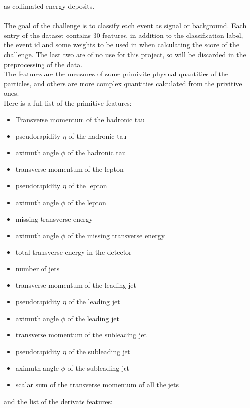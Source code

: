 \documentclass[12pt]{article}
\begin{document}
as collimated energy deposits. \\ \\
The goal of the challenge is to classify each event as signal or background. Each entry of the dataset
contains $30$ features, in addition to the classification label, the event id and some weights to be used
in when calculating the score of the challenge. The last two are of no use for this project, so will be 
discarded in the preprocessing of the data. \\
The features are the measures of some primivite physical quantities of the particles, and others are more
complex quantities calculated from the privitive ones. \\
Here is a full list of the primitive features:
\begin{itemize}
  \item Transverse momentum of the hadronic tau
  \item pseudorapidity $\eta$ of the hadronic tau
  \item aximuth angle $\phi$ of the hadronic tau
  \item transverse momentum of the lepton
  \item pseudorapidity $\eta$ of the lepton
  \item aximuth angle $\phi$ of the lepton
  \item missing transverse energy
  \item aximuth angle $\phi$ of the missing transverse energy
  \item total transverse energy in the detector
  \item number of jets
  \item transverse momentum of the leading jet
  \item pseudorapidity $\eta$ of the leading jet
  \item aximuth angle $\phi$ of the leading jet
  \item transverse momentum of the subleading jet
  \item pseudorapidity $\eta$ of the subleading jet
  \item aximuth angle $\phi$ of the subleading jet
  \item scalar sum of the transverse momentum of all the jets
\end{itemize}
and the list of the derivate features:
\end{document}
